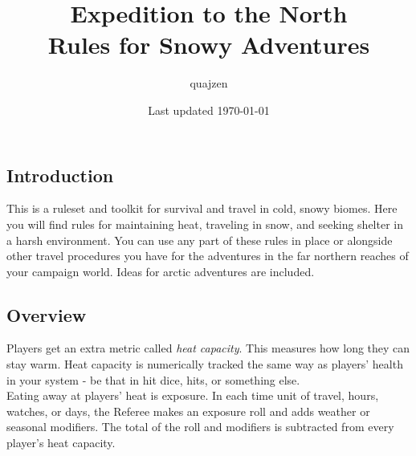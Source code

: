\documentclass[notitlepage]{article}
\title{Expedition to the North\\ \large Rules for Snowy Adventures}
\author{quajzen}
\date{Last updated \today}
\begin{document}
\large
\maketitle
\vfill
\pagebreak
\tableofcontents
\listoffigures

\pagebreak

\begin{multicols*}{2}
  \section{Introduction}

  This is a ruleset and toolkit for survival and travel in cold, snowy biomes.
  Here you will find rules for maintaining heat, traveling in snow, and seeking shelter in a harsh environment.
  You can use any part of these rules in place or alongside other travel procedures you have for the adventures in the far northern reaches of your campaign world.
  Ideas for arctic adventures are included. \\

  \subsection*{Overview}

  Players get an extra metric called \emph{heat capacity}.
  This measures how long they can stay warm.
  Heat capacity is numerically tracked the same way as players' health in your system - be that in hit dice, hits, or something else. \\
  
  Eating away at players' heat is exposure.
  In each time unit of travel, hours, watches, or days, the Referee makes an exposure roll and adds weather or seasonal modifiers.
  The total of the roll and modifiers is subtracted from every player's heat capacity. \\

  

\end{multicols*}
\end{document}
